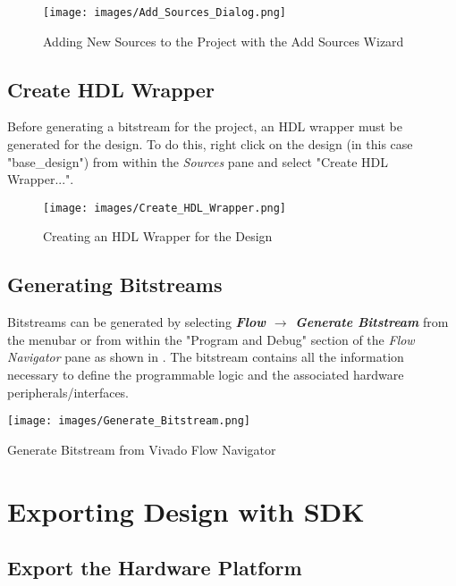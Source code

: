 \begin{figure}
	\centering
	\texttt{[image: images/Add\_Sources\_Dialog.png]}
	\caption{Adding New Sources to the Project with the Add Sources Wizard}
	\label{fig:addsourceswiz}
\end{figure}


\subsection{Create HDL Wrapper}

Before generating a bitstream for the project, an HDL wrapper must be generated for the design. To do this, right click on the design (in this case "base\_design") from within the \textit{Sources} pane and select "Create HDL Wrapper...". 


\begin{figure}
	\centering
	\texttt{[image: images/Create\_HDL\_Wrapper.png]}
	\caption{Creating an HDL Wrapper for the Design}
	\label{fig:createhdlwrapper}
\end{figure}


\subsection{Generating Bitstreams}

Bitstreams can be generated by selecting \textit{\bfseries Flow $\rightarrow$ Generate Bitstream} from the menubar or from within the "Program and Debug" section of the \textit{Flow Navigator} pane as shown in . The bitstream contains all the information necessary to define the programmable logic and the associated hardware peripherals/interfaces.

\begin{marginfigure}
	\centering
	\texttt{[image: images/Generate\_Bitstream.png]}
	\caption[Generate Bitstream from Vivado Flow Navigator]{Generate Bitstream from Vivado Flow Navigator}
	\label{fig:genbitstream}
\end{marginfigure}





\section{Exporting Design with SDK}

\subsection{Export the Hardware Platform}

